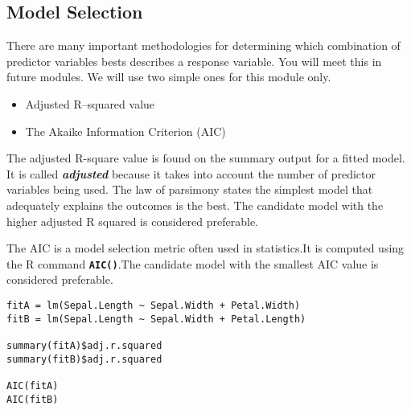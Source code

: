 \documentclass[ModuleBmain.tex]{subfiles}
\begin{document}
\subsection{Model Selection}
There are many important methodologies for determining which combination of predictor variables bests describes a response variable. You will meet this in future modules.
We will use two simple ones for this module only.
\begin{itemize}
\item Adjusted R–squared value
\item The Akaike Information Criterion (AIC)
\end{itemize}


The adjusted R-square value is found on the summary output for a fitted model. It is called \textbf{\emph{adjusted}} because it takes into account the number of predictor variables being used. The law of parsimony states the simplest model that adequately explains the outcomes is the best. The candidate model with the higher adjusted R squared is considered preferable.

The AIC is a model selection metric often used in statistics.It is computed using the R command
\texttt{\textbf{AIC()}}.The candidate model with the smallest AIC value is considered preferable.

\begin{framed}
\begin{verbatim}
fitA = lm(Sepal.Length ~ Sepal.Width + Petal.Width)
fitB = lm(Sepal.Length ~ Sepal.Width + Petal.Length)

summary(fitA)$adj.r.squared
summary(fitB)$adj.r.squared

AIC(fitA)
AIC(fitB)
\end{verbatim}
\end{framed}

\end{document}
